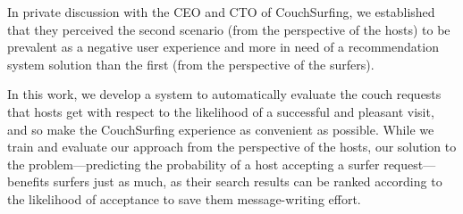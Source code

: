 In private discussion with the CEO and CTO of CouchSurfing, we established that they perceived the second scenario (from the perspective of the hosts) to be prevalent as a negative user experience and more in need of a recommendation system solution than the first (from the perspective of the surfers).

In this work, we develop a system to automatically evaluate the couch requests that hosts get with respect to the likelihood of a successful and pleasant visit, and so make the CouchSurfing experience as convenient as possible.
While we train and evaluate our approach from the perspective of the hosts, our solution to the problem---predicting the probability of a host accepting a surfer request---benefits surfers just as much, as their search results can be ranked according to the likelihood of acceptance to save them message-writing effort.

